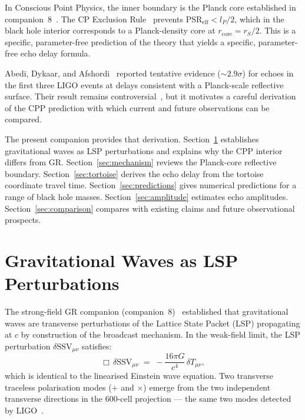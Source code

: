 \documentclass[12pt]{article}
\newcommand{\lP}{l_P}
\newcommand{\rS}{r_S}
\newcommand{\rcore}{r_{\mathrm{core}}}
\newcommand{\PSR}{\mathrm{PSR}}
\newcommand{\SSV}{\mathrm{SSV}}
\begin{document}
In Conscious Point Physics, the inner boundary is the Planck core
established in companion~8~\cite{c8}.  The CP Exclusion Rule~\cite{c1}
prevents $\PSR_{\mathrm{eff}} < \lP/2$, which in the black hole interior
corresponds to a Planck-density core at $\rcore = \rS/2$.  This is a
specific, parameter-free prediction of the theory that yields a specific,
parameter-free echo delay formula.

Abedi, Dykaar, and Afshordi~\cite{abedi2016} reported tentative evidence
($\sim\!2.9\sigma$) for echoes in the first three LIGO events at delays
consistent with a Planck-scale reflective surface.  Their result remains
controversial~\cite{westerweck2018, conti2024}, but it motivates a careful
derivation of the CPP prediction with which current and future observations
can be compared.

The present companion provides that derivation.
Section~\ref{sec:lsp_waves} establishes gravitational waves as LSP
perturbations and explains why the CPP interior differs from GR.
Section~\ref{sec:mechanism} reviews the Planck-core reflective boundary.
Section~\ref{sec:tortoise} derives the echo delay from the tortoise
coordinate travel time.  Section~\ref{sec:predictions} gives numerical
predictions for a range of black hole masses.  Section~\ref{sec:amplitude}
estimates echo amplitudes.  Section~\ref{sec:comparison} compares with
existing claims and future observational prospects.

\section{Gravitational Waves as LSP Perturbations}
\label{sec:lsp_waves}

The strong-field GR companion (companion~8)~\cite{c8} established that
gravitational waves are transverse perturbations of the Lattice State
Packet (LSP) propagating at $c$ by construction of the broadcast
mechanism.  In the weak-field limit, the LSP perturbation
$\delta\SSV_{\mu\nu}$ satisfies:
\begin{equation}
  \Box\,\delta\SSV_{\mu\nu}
  \;=\; -\frac{16\pi G}{c^4}\,\delta T_{\mu\nu},
  \label{eq:lsp_wave}
\end{equation}
which is identical to the linearised Einstein wave equation.  Two
transverse traceless polarisation modes ($+$ and $\times$) emerge from
the two independent transverse directions in the 600-cell projection —
the same two modes detected by LIGO~\cite{ligo2016}.
\end{document}
